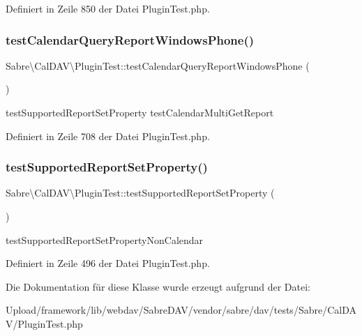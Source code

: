 Definiert in Zeile 850 der Datei Plugin\+Test.\+php.

\mbox{\label{class_sabre_1_1_cal_d_a_v_1_1_plugin_test_a20f07f9766b6f591278d62f1442e6492}} 
\subsubsection{\texorpdfstring{test\+Calendar\+Query\+Report\+Windows\+Phone()}{testCalendarQueryReportWindowsPhone()}}
{\footnotesize\ttfamily Sabre\textbackslash{}\+Cal\+D\+A\+V\textbackslash{}\+Plugin\+Test\+::test\+Calendar\+Query\+Report\+Windows\+Phone (\begin{DoxyParamCaption}{ }\end{DoxyParamCaption})}

test\+Supported\+Report\+Set\+Property  test\+Calendar\+Multi\+Get\+Report 

Definiert in Zeile 708 der Datei Plugin\+Test.\+php.

\mbox{\label{class_sabre_1_1_cal_d_a_v_1_1_plugin_test_a1a52123867107a9932e33fdb8ddb495d}} 
\subsubsection{\texorpdfstring{test\+Supported\+Report\+Set\+Property()}{testSupportedReportSetProperty()}}
{\footnotesize\ttfamily Sabre\textbackslash{}\+Cal\+D\+A\+V\textbackslash{}\+Plugin\+Test\+::test\+Supported\+Report\+Set\+Property (\begin{DoxyParamCaption}{ }\end{DoxyParamCaption})}

test\+Supported\+Report\+Set\+Property\+Non\+Calendar 

Definiert in Zeile 496 der Datei Plugin\+Test.\+php.



Die Dokumentation für diese Klasse wurde erzeugt aufgrund der Datei\+:\begin{DoxyCompactItemize}
\item 
Upload/framework/lib/webdav/\+Sabre\+D\+A\+V/vendor/sabre/dav/tests/\+Sabre/\+Cal\+D\+A\+V/Plugin\+Test.\+php\end{DoxyCompactItemize}
